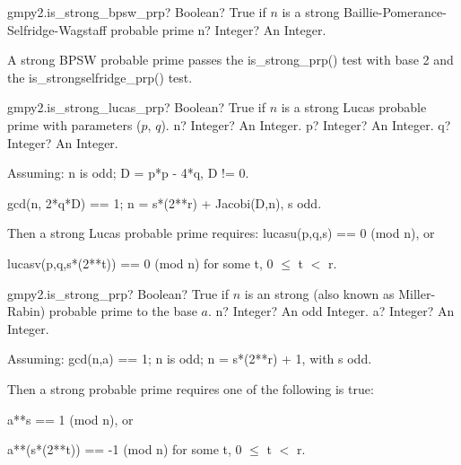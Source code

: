 \vspace{0.6cm}
\begin{mpFunctionsExtract}
	\mpFunctionOne
	{gmpy2.is\_strong\_bpsw\_prp? Boolean? True if $n$ is a strong Baillie-Pomerance-Selfridge-Wagstaff probable prime}
	{n? Integer? An Integer.}
\end{mpFunctionsExtract}

\vspace{0.3cm}
A strong BPSW probable prime passes the is\_strong\_prp() test with base 2 and the is\_strongselfridge\_prp() test.



\vspace{0.6cm}
\begin{mpFunctionsExtract}
	\mpFunctionThree
	{gmpy2.is\_strong\_lucas\_prp? Boolean? True if $n$ is a strong Lucas probable prime with parameters ($p$, $q$).}
	{n? Integer? An Integer.}
	{p? Integer? An Integer.}
	{q? Integer? An Integer.}
\end{mpFunctionsExtract}

\vspace{0.3cm}

Assuming: n is odd; D = p*p - 4*q, D != 0.

gcd(n, 2*q*D) == 1; n = s*(2**r) + Jacobi(D,n), s odd.

\vpara
Then a strong Lucas probable prime requires: lucasu(p,q,s) == 0 (mod n), or

lucasv(p,q,s*(2**t)) == 0 (mod n) for some t, 0 $\le$ t $<$ r.







\vspace{0.6cm}
\begin{mpFunctionsExtract}
	\mpFunctionTwo
	{gmpy2.is\_strong\_prp? Boolean? True if $n$ is an strong (also known as Miller-Rabin) probable prime to the base $a$.}
	{n? Integer? An odd Integer.}
	{a? Integer? An Integer.}
\end{mpFunctionsExtract}

\vspace{0.3cm}
Assuming: gcd(n,a) == 1; n is odd; n = s*(2**r) + 1, with s odd.

Then a strong probable prime requires one of the following is true:

a**s == 1 (mod n), or

a**(s*(2**t)) == -1 (mod n) for some t, 0 $\le$ t $<$ r.



